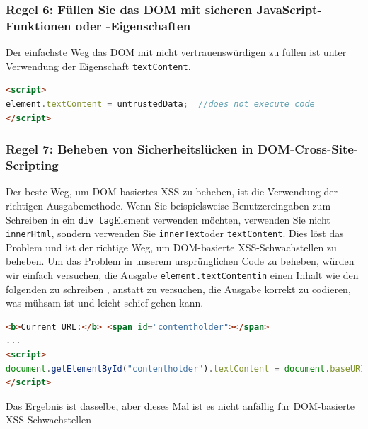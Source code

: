 \subsubsection{Regel 6: Füllen Sie das DOM mit sicheren JavaScript-Funktionen oder -Eigenschaften}

Der einfachste Weg das DOM mit nicht vertrauenswürdigen zu füllen ist unter Verwendung der Eigenschaft \verb+textContent+.

\begin{lstlisting}[language=HTML, numbers=none, caption={Regel 6 - Beispiel Sichere JavaScript Funktionen oder Eigenschaften}, label=Beispiel Sichere JavaScript-Funktionen oder -Eigenschaften]
<script>
element.textContent = untrustedData;  //does not execute code
</script>
\end{lstlisting}

\subsubsection{Regel 7: Beheben von Sicherheitslücken in DOM-Cross-Site-Scripting}

Der beste Weg, um DOM-basiertes XSS zu beheben, ist die Verwendung der richtigen Ausgabemethode. Wenn Sie beispielsweise Benutzereingaben zum Schreiben in ein \verb+div tag+Element verwenden möchten, verwenden Sie nicht \verb+innerHtml+, sondern verwenden Sie \verb+innerText+oder \verb+textContent+. Dies löst das Problem und ist der richtige Weg, um DOM-basierte XSS-Schwachstellen zu beheben. Um das Problem in unserem ursprünglichen Code zu beheben, würden wir einfach versuchen, die Ausgabe \verb+element.textContentin+ einen Inhalt wie den folgenden zu schreiben , anstatt zu versuchen, die Ausgabe korrekt zu codieren, was mühsam ist und leicht schief gehen kann.

\begin{lstlisting}[language=HTML, numbers=none, caption={Regel 6 - Beispiel Sichere JavaScript Funktionen oder Eigenschaften}, label=Beispiel Sichere JavaScript-Funktionen oder -Eigenschaften]
<b>Current URL:</b> <span id="contentholder"></span>
...
<script>
document.getElementById("contentholder").textContent = document.baseURI;
</script>
\end{lstlisting}

Das Ergebnis ist dasselbe, aber dieses Mal ist es nicht anfällig für DOM-basierte XSS-Schwachstellen